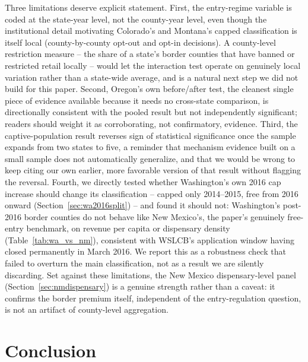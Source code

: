 \documentclass[12pt]{article}
\begin{document}
Three limitations deserve explicit statement. First, the entry-regime variable is coded at the state-year
level, not the county-year level, even though the institutional detail motivating Colorado's and Montana's
capped classification is itself local (county-by-county opt-out and opt-in decisions). A county-level
restriction measure -- the share of a state's border counties that have banned or restricted retail locally --
would let the interaction test operate on genuinely local variation rather than a state-wide average, and is a
natural next step we did not build for this paper. Second, Oregon's own before/after test, the cleanest single
piece of evidence available because it needs no cross-state comparison, is directionally consistent with the
pooled result but not independently significant; readers should weight it as corroborating, not confirmatory,
evidence. Third, the captive-population result reverses sign of statistical significance once the sample
expands from two states to five, a reminder that mechanism evidence built on a small sample does not
automatically generalize, and that we would be wrong to keep citing our own earlier, more favorable version of
that result without flagging the reversal. Fourth, we directly tested whether Washington's own 2016 cap
increase should change its classification -- capped only 2014--2015, free from 2016 onward
(Section~\ref{sec:wa2016split}) -- and found it should not: Washington's post-2016 border counties do not
behave like New Mexico's, the paper's genuinely free-entry benchmark, on revenue per capita or dispensary
density (Table~\ref{tab:wa_vs_nm}), consistent with WSLCB's application window having closed permanently in
March 2016. We report this as a robustness check that failed to overturn the main classification, not as a
result we are silently discarding. Set against these limitations, the New Mexico dispensary-level panel
(Section~\ref{sec:nmdispensary}) is a genuine strength rather than a caveat: it confirms the border premium
itself, independent of the entry-regulation question, is not an artifact of county-level aggregation.

\section{Conclusion}
\label{sec:conclusion}
\end{document}
